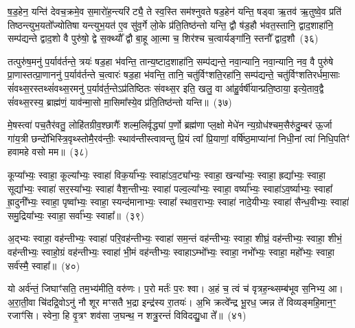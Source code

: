 ष॒ड॒हेन॒ यन्ति॑ देवच॒क्रमे॒व स॒मारो॑ह॒न्त्यरि॑ट्यै॒ ते स्व॒स्ति सम॑श्नुवते षड॒हेन॑ यन्ति॒ षड्वा ऋ॒तव॑ ऋ॒तुष्वे॒व प्रति॑ तिष्ठन्त्युभ॒यतो᳚ज्योतिषा यन्त्युभ॒यत॑ ए॒व सु॑व॒र्गे लो॒के प्र॑ति॒तिष्ठ॑न्तो यन्ति॒ द्वौ ष॑ड॒हौ भ॑वत॒स्तानि॒ द्वाद॒शाहा॑नि॒ सम्प॑द्यन्ते द्वाद॒शो वै पुरु॑षो॒ द्वे स॒क्थ्यौ᳚ द्वौ बा॒हू आ॒त्मा च॒ शिर॑श्च च॒त्वार्यङ्गा॑नि॒ स्तनौ᳚ द्वाद॒शौ~(३६)

तत्पुरु॑ष॒मनु॑ प॒र्याव॑र्तन्ते॒ त्रयः॑ षड॒हा भ॑वन्ति॒ तान्य॒ष्टाद॒शाहा॑नि॒ सम्प॑द्यन्ते॒ नवा॒न्यानि॒ नवा॒न्यानि॒ नव॒ वै पुरु॑षे प्रा॒णास्तत्प्रा॒णाननु॑ प॒र्याव॑र्तन्ते च॒त्वारः॑ षड॒हा भ॑वन्ति॒ तानि॒ चतु॑र्विꣳशति॒रहा॑नि॒ सम्प॑द्यन्ते॒ चतु॑र्विꣳशतिरर्धमा॒साः सं॑वथ्स॒रस्तथ्सं॑वथ्स॒रमनु॑ प॒र्याव॑र्त॒न्ते\-ऽप्र॑तिष्ठितः संवथ्स॒र इति॒ खलु॒ वा आ॑हु॒र्वर्\mbox{}षी॑यान्प्रति॒ष्ठाया॒ इत्ये॒ताव॒द्वै सं॑वथ्स॒रस्य॒ ब्राह्म॑णं॒ याव॑न्मा॒सो मा॒सिमा᳚स्ये॒व प्र॑ति॒तिष्ठ॑न्तो यन्ति॥~(३७)

{\anuvakamend[{वि॒राज॑मे॒तेन॑ द्वाद॒शावे॒ताव॒द्वा अ॒ष्टौ च॑}]}%

मे॒षस्त्वा॑ पच॒तैर॑वतु॒ लोहि॑तग्रीव॒श्छागैः᳚ शल्म॒लिर्वृद्ध्या॑ प॒र्णो ब्रह्म॑णा प्ल॒क्षो मेधे॑न न्य॒ग्रोध॑श्चम॒सैरु॑दु॒म्बर॑ ऊ॒र्जा गा॑य॒त्री छन्दो॑भिस्त्रि॒वृथ्स्तोमै॒रव॑न्तीः॒ स्थाव॑न्तीस्त्वावन्तु प्रि॒यं त्वा᳚ प्रि॒याणां॒ वर्\mbox{}षि॑ष्ठ॒माप्या॑नां निधी॒नां त्वा॑ निधि॒पतिꣳ॑ हवामहे वसो मम॥~(३८)

{\anuvakamend[{मे॒षः षट्त्रिꣳ॑शत्}]}%

कूप्या᳚भ्यः॒ स्वाहा॒ कूल्या᳚भ्यः॒ स्वाहा॑ विक॒र्या᳚भ्यः॒ स्वाहा॑\-ऽव॒ट्या᳚भ्यः॒ स्वाहा॒ खन्या᳚भ्यः॒ स्वाहा॒ ह्रद्या᳚भ्यः॒ स्वाहा॒ सूद्या᳚भ्यः॒ स्वाहा॑ सर॒स्या᳚भ्यः॒ स्वाहा॑ वैश॒न्तीभ्यः॒ स्वाहा॑ पल्व॒ल्या᳚भ्यः॒ स्वाहा॒ वर्ष्या᳚भ्यः॒ स्वाहा॑\-ऽव॒र्ष्याभ्यः॒ स्वाहा᳚ ह्रा॒दुनी᳚भ्यः॒ स्वाहा॒ पृष्वा᳚भ्यः॒ स्वाहा॒ स्यन्द॑मानाभ्यः॒ स्वाहा᳚ स्थाव॒राभ्यः॒ स्वाहा॑ नादे॒यीभ्यः॒ स्वाहा॑ सैन्ध॒वीभ्यः॒ स्वाहा॑ समु॒द्रिया᳚भ्यः॒ स्वाहा॒ सर्वा᳚भ्यः॒ स्वाहा᳚॥~(३९)

{\anuvakamend[{कूप्या᳚भ्यश्चत्वारि॒ꣳ॒शत्}]}%

अ॒द्भ्यः स्वाहा॒ वह॑न्तीभ्यः॒ स्वाहा॑ परि॒वह॑न्तीभ्यः॒ स्वाहा॑ सम॒न्तं वह॑न्तीभ्यः॒ स्वाहा॒ शीघ्रं॒ वह॑न्तीभ्यः॒ स्वाहा॒ शीभं॒ वह॑न्तीभ्यः॒ स्वाहो॒ग्रं वह॑न्तीभ्यः॒ स्वाहा॑ भी॒मं वह॑न्तीभ्यः॒ स्वाहा\-ऽम्भो᳚भ्यः॒ स्वाहा॒ नभो᳚भ्यः॒ स्वाहा॒ महो᳚भ्यः॒ स्वाहा॒ सर्व॑स्मै॒ स्वाहा᳚॥~(४०)

{\anuvakamend[{अ॒द्भ्य एका॒न्नत्रि॒ꣳ॒शत्}]}%

यो अर्व॑न्तं॒ जिघाꣳ॑सति॒ तम॒भ्य॑मीति॒ वरु॑णः। प॒रो मर्तः॑ प॒रः श्वा। अ॒हं च॒ त्वं च॑ वृत्रह॒न्थ्सम्ब॑भूव स॒निभ्य॒ आ। अ॒रा॒ती॒वा चि॑दद्रि॒वो\-ऽनु॑ नौ शूर मꣳसतै भ॒द्रा इन्द्र॑स्य रा॒तयः॑। अ॒भि क्रत्वे᳚न्द्र भू॒रध॒ ज्मन्न ते॑ विव्यङ्महि॒मान॒ꣳ॒ रजाꣳ॑सि। स्वेना॒ हि वृ॒त्रꣳ शव॑सा ज॒घन्थ॒ न शत्रु॒रन्तं॑ विविदद्यु॒धा ते᳚॥~(४१)

